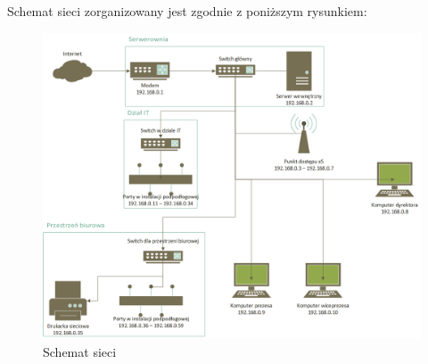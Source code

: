 \documentclass{article}
\begin{document}
        Schemat sieci zorganizowany jest zgodnie z poniższym rysunkiem:
        \begin{figure}[H]
            \centering
            \includegraphics[width=1.0\linewidth]{assets/schemat_sieci.png}
            \caption{Schemat sieci}
        \end{figure}
\end{document}
